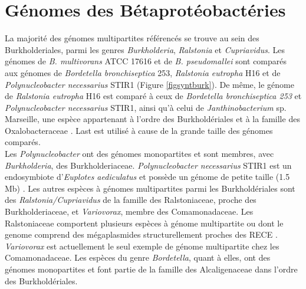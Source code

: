 \section{Génomes des Bétaprotéobactéries}\label{parburk}\label{parrals}
    La majorité des génomes multipartites référencés se trouve au sein des Burkholderiales, parmi les genres \textit{Burkholderia}, \textit{Ralstonia} et \textit{Cupriavidus}. Les génomes de \textit{B. multivorans} ATCC 17616 et de \textit{B. pseudomallei} sont comparés aux génomes de \textit{Bordetella bronchiseptica} 253, \textit{Ralstonia eutropha} H16 et de \textit{Polynucleobacter necessarius} STIR1 (Figure \ref{figsyntburk}). De même, le génome de \textit{Ralstonia eutropha} H16 est comparé à ceux de \textit{Bordetella bronchiseptica 253} et  \textit{Polynucleobacter necessarius} STIR1, ainsi qu'à celui de \textit{Janthinobacterium} sp. Marseille, une espèce appartenant à l'ordre des Burkholdériales et à la famille des Oxalobacteraceae \citep{hornung2013janthinobacterium}. Last est utilisé à cause de la grande taille des génomes comparés. \\
    Les \textit{Polynucleobacter} ont des génomes monopartites et sont membres, avec \textit{Burkholderia}, des Burkholderiaceae. \textit{Polynucleobacter necessarius} STIR1 est un endosymbiote d'\textit{Euplotes aediculatus} et possède un génome de petite taille (1.5 Mb) \citep{hahn2009emended}. Les autres espèces à génomes multipartites parmi les Burkholdériales sont des \textit{Ralstonia/Cupriavidus} de la famille des Ralstoniaceae, proche des Burkholderiaceae, et \textit{Variovorax}, membre des Comamonadaceae. Les Ralstoniaceae comportent plusieurs espèces à génome multipartite ou dont le genome comprend des mégaplasmides structurellement proches des RECE \citep{Passot2012}. \textit{Variovorax} est actuellement le seul exemple de génome multipartite chez les Comamonadaceae. Les espèces du genre \textit{Bordetella}, quant à elles, ont des génomes monopartites et font partie de la famille des Alcaligenaceae dans l'ordre des Burkholdériales. 


